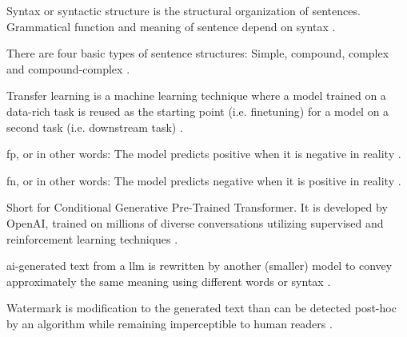 \begin{definition}
    [Syntax]
    Syntax or syntactic structure is the structural organization of sentences.
    Grammatical function and meaning of sentence depend on syntax \cite{kurt_pehlivanoglu_comparative_2024}.
\end{definition}

\begin{definition}
    There are four basic types of sentence structures: Simple, compound, complex and compound-complex \cite{kurt_pehlivanoglu_comparative_2024}.
\end{definition}

\begin{definition}
    Transfer learning is a machine learning technique where a model trained on a data-rich task is 
    reused as the starting point (i.e. finetuning) for a model on a second task (i.e. downstream task) \cite{palivela_optimization_2021}.
\end{definition}

\begin{definition}
    \ac{fp}, or in other words: The model predicts positive when it is negative in reality \cite{palivela_optimization_2021}.
\end{definition}

\begin{definition}
    \ac{fn}, or in other words: The model predicts negative when it is positive in reality \cite{palivela_optimization_2021}.
\end{definition}

\begin{definition}
    [ChatGPT]
    Short for Conditional Generative Pre-Trained Transformer.
    It is developed by OpenAI, trained on millions of diverse conversations utilizing supervised and reinforcement learning techniques \cite{kurt_pehlivanoglu_comparative_2024}.
\end{definition}

\begin{definition}
    \ac{ai}-generated text from a \ac{llm} is rewritten by another (smaller) model to convey approximately the same meaning using different words or syntax \cite{krishna_paraphrasing_2023}.
\end{definition}

\begin{definition}
    [Watermark]
    Watermark is modification to the generated text than can be detected post-hoc by an algorithm while remaining imperceptible to human readers \cite{krishna_paraphrasing_2023}.
\end{definition}

